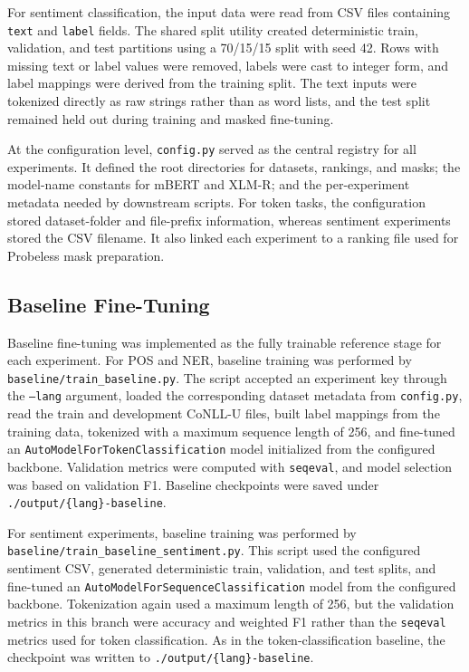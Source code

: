 \documentclass[12pt]{article}
\begin{document}
For sentiment classification, the input data were read from CSV files containing \texttt{text} and \texttt{label} fields. The shared split utility created deterministic train, validation, and test partitions using a 70/15/15 split with seed 42. Rows with missing text or label values were removed, labels were cast to integer form, and label mappings were derived from the training split. The text inputs were tokenized directly as raw strings rather than as word lists, and the test split remained held out during training and masked fine-tuning.

At the configuration level, \texttt{config.py} served as the central registry for all experiments. It defined the root directories for datasets, rankings, and masks; the model-name constants for mBERT and XLM-R; and the per-experiment metadata needed by downstream scripts. For token tasks, the configuration stored dataset-folder and file-prefix information, whereas sentiment experiments stored the CSV filename. It also linked each experiment to a ranking file used for Probeless mask preparation.

\subsection{Baseline Fine-Tuning}

Baseline fine-tuning was implemented as the fully trainable reference stage for each experiment. For POS and NER, baseline training was performed by \texttt{baseline/train\_baseline.py}. The script accepted an experiment key through the \texttt{--lang} argument, loaded the corresponding dataset metadata from \texttt{config.py}, read the train and development CoNLL-U files, built label mappings from the training data, tokenized with a maximum sequence length of 256, and fine-tuned an \texttt{AutoModelForTokenClassification} model initialized from the configured backbone. Validation metrics were computed with \texttt{seqeval}, and model selection was based on validation F1. Baseline checkpoints were saved under \texttt{./output/\{lang\}-baseline}.

For sentiment experiments, baseline training was performed by \texttt{baseline/train\_baseline\_sentiment.py}. This script used the configured sentiment CSV, generated deterministic train, validation, and test splits, and fine-tuned an \texttt{AutoModelForSequenceClassification} model from the configured backbone. Tokenization again used a maximum length of 256, but the validation metrics in this branch were accuracy and weighted F1 rather than the \texttt{seqeval} metrics used for token classification. As in the token-classification baseline, the checkpoint was written to \texttt{./output/\{lang\}-baseline}.
\end{document}
